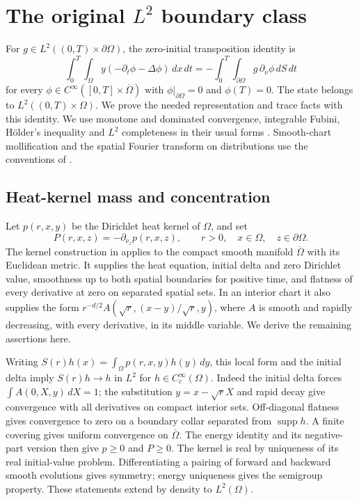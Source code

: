 \documentclass[11pt]{article}
\theoremstyle{remark}
\newcommand{\Om}{\Omega}
\newcommand{\dt}{\partial_t}
\newcommand{\dn}{\partial_\nu}
\begin{document}
\section{The original \texorpdfstring{$L^2$}{L2} boundary class}\label{sec:trace}

For $g\in L^2((0,T)\times\partial\Om)$, the zero-initial transposition
identity is
\begin{equation}\label{eq:transposition}
 \int_0^T\int_\Om y(-\dt\phi-\Delta\phi)\,dx\,dt
       =-\int_0^T\int_{\partial\Om}g\,\dn\phi\,dS\,dt
\end{equation}
for every $\phi\in C^\infty([0,T]\times\overline\Om)$ with
$\phi|_{\partial\Om}=0$ and $\phi(T)=0$.
The state belongs to $L^2((0,T)\times\Om)$.
We prove the needed representation and trace facts with this identity.
We use monotone and dominated convergence, integrable Fubini,
H\"older's inequality and $L^2$ completeness in their usual forms
\cite[Theorems~4.6, 4.24, 5.18, 7.7, 7.10]{HM}.
Smooth-chart mollification and the spatial Fourier transform on
distributions use the conventions of
\cite[Sections~1.9--1.12, 5.A--5.B]{HP}.

\subsection{Heat-kernel mass and concentration}
Let $p(r,x,y)$ be the Dirichlet heat kernel of $\Om$, and set
\begin{equation}\label{eq:P}
 P(r,x,z)=-\partial_{\nu_z}p(r,x,z),
 \qquad r>0,\quad x\in\Om,\quad z\in\partial\Om.
\end{equation}
The kernel construction in \cite[Theorems~3.1, 3.12 and
Definitions~2.1, 3.3]{G} applies to the compact smooth manifold
$\overline\Om$ with its Euclidean metric.
It supplies the heat equation, initial delta and zero Dirichlet value,
smoothness up to both spatial boundaries for positive time, and
flatness of every derivative at zero on separated spatial sets.
In an interior chart it also supplies the form
$r^{-d/2}A(\sqrt r,(x-y)/\sqrt r,y)$, where $A$ is smooth and rapidly
decreasing, with every derivative, in its middle variable.
We derive the remaining assertions here.

Writing $S(r)h(x)=\int_\Om p(r,x,y)h(y)\,dy$, this local form and the initial
delta imply $S(r)h\to h$ in $L^2$ for
$h\in C^\infty_c(\Om)$.
Indeed the initial delta forces $\int A(0,X,y)\,dX=1$;
the substitution $y=x-\sqrt r X$ and rapid decay give convergence with all
derivatives on compact interior sets. Off-diagonal flatness gives convergence
to zero on a boundary collar separated from $\operatorname{supp}h$.
A finite covering gives uniform convergence on $\overline\Om$.
The energy identity and its negative-part version then give
$p\geq0$ and $P\geq0$.
The kernel is real by uniqueness of its real initial-value problem.
Differentiating a pairing of forward and backward smooth evolutions gives
symmetry; energy uniqueness gives the semigroup property.
These statements extend by density to $L^2(\Om)$.
\end{document}
